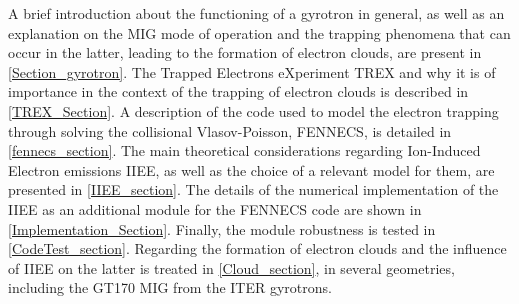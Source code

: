 A brief introduction about the functioning of a gyrotron in general, as well as an explanation on the MIG mode of operation and the trapping phenomena that can occur in the latter, leading to the formation of electron clouds, are present in \ref{Section_gyrotron}. The Trapped Electrons eXperiment TREX and why it is of importance in the context of the trapping of electron clouds is described in \ref{TREX_Section}. A description of the code used to model the electron trapping through solving the collisional Vlasov-Poisson, FENNECS, is detailed in \ref{fennecs_section}. The main theoretical considerations regarding Ion-Induced Electron emissions IIEE, as well as the choice of a relevant model for them, are presented in \ref{IIEE_section}. The details of the numerical implementation of the IIEE as an additional module for the FENNECS code are shown in \ref{Implementation_Section}.  Finally, the module robustness is tested in \ref{CodeTest_section}.  Regarding the formation of electron clouds and the influence of IIEE on the latter is treated in \ref{Cloud_section}, in several geometries, including the GT170 MIG from the ITER gyrotrons. 